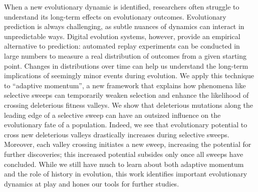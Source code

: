 When a new evolutionary dynamic is identified, researchers often struggle to understand its long-term effects on evolutionary outcomes.
Evolutionary prediction is always challenging, as subtle nuances of dynamics can interact in unpredictable ways.
Digital evolution systems, however, provide an empirical alternative to prediction: automated replay experiments can be conducted in large numbers to measure a real distribution of outcomes from a given starting point.
Changes in distributions over time can help us understand the long-term implications of seemingly minor events during evolution.
We apply this technique to ``adaptive momentum'', a new framework that explains how phenomena like selective sweeps can temporarily weaken selection and enhance the likelihood of crossing deleterious fitness valleys.
We show that deleterious mutations along the leading edge of a selective sweep can have an outsized influence on the evolutionary fate of a population.
Indeed, we see that evolutionary potential to cross new deleterious valleys drastically increases during selective sweeps.
Moreover, each valley crossing initiates a new sweep, increasing the potential for further discoveries; this increased potential subsides only once all sweeps have concluded.
While we still have much to learn about both adaptive momentum and the role of history in evolution, this work identifies important evolutionary dynamics at play and hones our tools for further studies.
